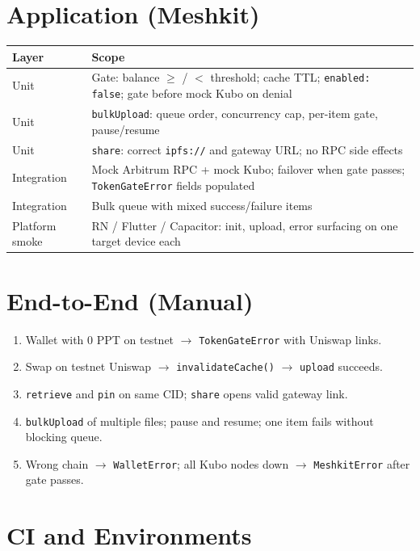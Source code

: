 \documentclass[11pt,a4paper,openany]{report}
\begin{document}
\section{Application (Meshkit)}

\begin{center}
\small
\begin{tabular}{@{}lp{9.5cm}@{}}
\toprule
\textbf{Layer} & \textbf{Scope} \\
\midrule
Unit & Gate: balance $\geq$ / $<$ threshold; cache TTL; \texttt{enabled: false}; gate before mock Kubo on denial \\
Unit & \texttt{bulkUpload}: queue order, concurrency cap, per-item gate, pause/resume \\
Unit & \texttt{share}: correct \texttt{ipfs://} and gateway URL; no RPC side effects \\
Integration & Mock Arbitrum RPC + mock Kubo; failover when gate passes; \texttt{TokenGateError} fields populated \\
Integration & Bulk queue with mixed success/failure items \\
Platform smoke & RN / Flutter / Capacitor: init, upload, error surfacing on one target device each \\
\bottomrule
\end{tabular}
\end{center}

\section{End-to-End (Manual)}

\begin{enumerate}[leftmargin=*]
  \item Wallet with 0 PPT on testnet $\rightarrow$ \texttt{TokenGateError} with Uniswap links.
  \item Swap on testnet Uniswap $\rightarrow$ \texttt{invalidateCache()} $\rightarrow$ \texttt{upload} succeeds.
  \item \texttt{retrieve} and \texttt{pin} on same CID; \texttt{share} opens valid gateway link.
  \item \texttt{bulkUpload} of multiple files; pause and resume; one item fails without blocking queue.
  \item Wrong chain $\rightarrow$ \texttt{WalletError}; all Kubo nodes down $\rightarrow$ \texttt{MeshkitError} after gate passes.
\end{enumerate}

\section{CI and Environments}
\end{document}
